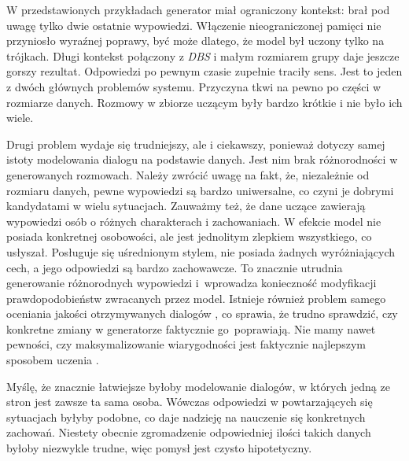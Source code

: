 W przedstawionych przykładach generator miał ograniczony kontekst: brał pod uwagę tylko dwie ostatnie wypowiedzi. Włączenie nieograniczonej pamięci nie przyniosło wyraźnej poprawy, być może dlatego, że model był uczony tylko na trójkach. Długi kontekst połączony z \textit{DBS} i małym rozmiarem grupy daje jeszcze gorszy rezultat. Odpowiedzi po pewnym czasie zupełnie traciły sens. Jest to jeden z dwóch głównych problemów systemu. Przyczyna tkwi na pewno po części w rozmiarze danych. Rozmowy w zbiorze uczącym były bardzo krótkie i nie było ich wiele.

Drugi problem wydaje się trudniejszy, ale i ciekawszy, ponieważ dotyczy samej istoty modelowania dialogu na podstawie danych. Jest nim brak różnorodności w generowanych rozmowach. Należy zwrócić uwagę na fakt, że, niezależnie od rozmiaru danych, pewne wypowiedzi są bardzo uniwersalne, co czyni je dobrymi kandydatami w wielu sytuacjach. Zauważmy też, że dane uczące zawierają wypowiedzi osób o różnych charakterach i zachowaniach. W efekcie model nie posiada konkretnej osobowości, ale jest jednolitym zlepkiem wszystkiego, co usłyszał. Posługuje się uśrednionym stylem, nie posiada żadnych wyróżniających cech, a jego odpowiedzi są bardzo zachowawcze. To znacznie utrudnia generowanie różnorodnych wypowiedzi i~wprowadza konieczność modyfikacji prawdopodobieństw zwracanych przez model. Istnieje również problem samego oceniania jakości otrzymywanych dialogów \cite{hownotto}, co sprawia, że trudno sprawdzić, czy konkretne zmiany w generatorze faktycznie go poprawiają. Nie mamy nawet pewności, czy maksymalizowanie wiarygodności jest faktycznie najlepszym sposobem uczenia \cite{serbanhred}.

Myślę, że znacznie łatwiejsze byłoby modelowanie dialogów, w których jedną ze stron jest zawsze ta sama osoba. Wówczas odpowiedzi w powtarzających się sytuacjach byłyby podobne, co daje nadzieję na nauczenie się konkretnych zachowań. Niestety obecnie zgromadzenie odpowiedniej ilości takich danych byłoby niezwykle trudne, więc pomysł jest czysto hipotetyczny.
